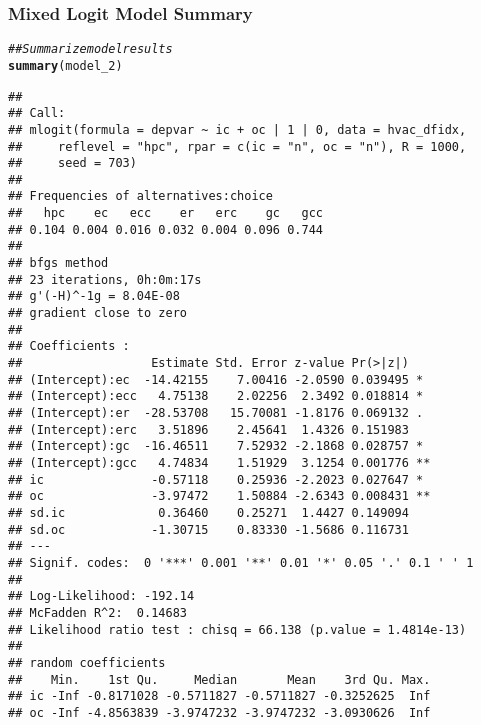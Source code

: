 \documentclass{beamer}\usepackage[]{graphicx}\usepackage[]{color}
\makeatletter
\newcommand{\hlcom}[1]{\textcolor[rgb]{0.678,0.584,0.686}{\textit{#1}}}%
\newcommand{\hlstd}[1]{\textcolor[rgb]{0.345,0.345,0.345}{#1}}%
\newcommand{\hlkwd}[1]{\textcolor[rgb]{0.737,0.353,0.396}{\textbf{#1}}}%
\newenvironment{kframe}{%
 \def\at@end@of@kframe{}%
 \ifinner\ifhmode%
  \def\at@end@of@kframe{\end{minipage}}%
  \begin{minipage}{\columnwidth}%
 \fi\fi%
 \def\FrameCommand##1{\hskip\@totalleftmargin \hskip-\fboxsep
 \colorbox{shadecolor}{##1}\hskip-\fboxsep
     \hskip-\linewidth \hskip-\@totalleftmargin \hskip\columnwidth}%
 \MakeFramed {\advance\hsize-\width
   \@totalleftmargin\z@ \linewidth\hsize
   \@setminipage}}%
 {\par\unskip\endMakeFramed%
 \at@end@of@kframe}
\newenvironment{knitrout}{}{} %
\makeatother
\begin{document}
\begin{frame}[fragile]\frametitle{Mixed Logit Model Summary}
	\vspace{1ex}
\begin{knitrout}\tiny
{}\color{fgcolor}\begin{kframe}
\begin{alltt}
\hlcom{## Summarize model results}
\hlkwd{summary}\hlstd{(model_2)}
\end{alltt}
\begin{verbatim}
## 
## Call:
## mlogit(formula = depvar ~ ic + oc | 1 | 0, data = hvac_dfidx, 
##     reflevel = "hpc", rpar = c(ic = "n", oc = "n"), R = 1000, 
##     seed = 703)
## 
## Frequencies of alternatives:choice
##   hpc    ec   ecc    er   erc    gc   gcc 
## 0.104 0.004 0.016 0.032 0.004 0.096 0.744 
## 
## bfgs method
## 23 iterations, 0h:0m:17s 
## g'(-H)^-1g = 8.04E-08 
## gradient close to zero 
## 
## Coefficients :
##                  Estimate Std. Error z-value Pr(>|z|)   
## (Intercept):ec  -14.42155    7.00416 -2.0590 0.039495 * 
## (Intercept):ecc   4.75138    2.02256  2.3492 0.018814 * 
## (Intercept):er  -28.53708   15.70081 -1.8176 0.069132 . 
## (Intercept):erc   3.51896    2.45641  1.4326 0.151983   
## (Intercept):gc  -16.46511    7.52932 -2.1868 0.028757 * 
## (Intercept):gcc   4.74834    1.51929  3.1254 0.001776 **
## ic               -0.57118    0.25936 -2.2023 0.027647 * 
## oc               -3.97472    1.50884 -2.6343 0.008431 **
## sd.ic             0.36460    0.25271  1.4427 0.149094   
## sd.oc            -1.30715    0.83330 -1.5686 0.116731   
## ---
## Signif. codes:  0 '***' 0.001 '**' 0.01 '*' 0.05 '.' 0.1 ' ' 1
## 
## Log-Likelihood: -192.14
## McFadden R^2:  0.14683 
## Likelihood ratio test : chisq = 66.138 (p.value = 1.4814e-13)
## 
## random coefficients
##    Min.    1st Qu.     Median       Mean    3rd Qu. Max.
## ic -Inf -0.8171028 -0.5711827 -0.5711827 -0.3252625  Inf
## oc -Inf -4.8563839 -3.9747232 -3.9747232 -3.0930626  Inf
\end{verbatim}
\end{kframe}
\end{knitrout}
\end{frame}
\end{document}
